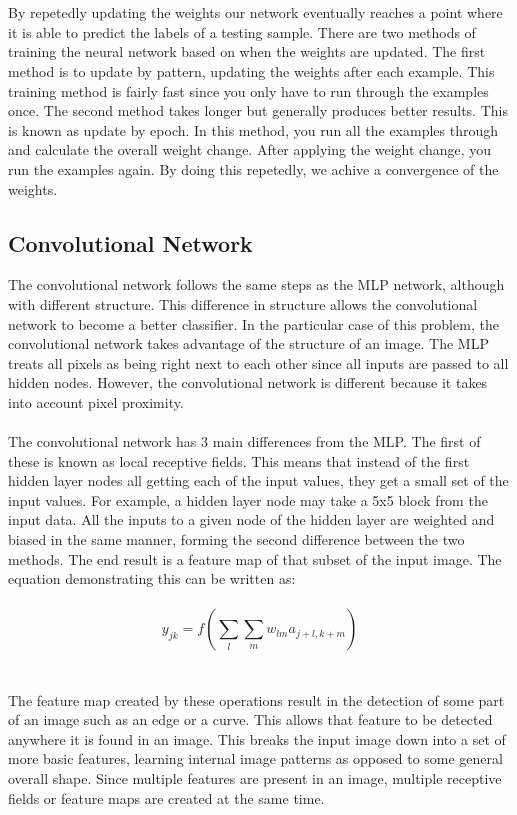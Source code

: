 \documentclass[paper=a4, fontsize=11pt]{scrartcl} %
\numberwithin{equation}{section} %
\numberwithin{figure}{section} %
\numberwithin{table}{section} %
\begin{document}
	\\\\
	By repetedly updating the weights our network eventually reaches a point where it is able to predict the labels of a testing sample. There are two methods of training the neural network based on when the weights are updated. The first method is to update by pattern, updating the weights after each example. This training method is fairly fast since you only have to run through the examples once. The second method takes longer but generally produces better results. This is known as update by epoch. In this method, you run all the examples through and calculate the overall weight change. After applying the weight change, you run the examples again. By doing this repetedly, we achive a convergence of the weights.
	\subsection{Convolutional Network}
	The convolutional network follows the same steps as the MLP network, although with different structure. This difference in structure allows the convolutional network to become a better classifier. In the particular case of this problem, the convolutional network takes advantage of the structure of an image. The MLP treats all pixels as being right next to each other since all inputs are passed to all hidden nodes. However, the convolutional network is different because it takes into account pixel proximity. 
	\\\\
	The convolutional network has 3 main differences from the MLP. The first of these is known as local receptive fields. This means that instead of the first hidden layer nodes all getting each of the input values, they get a small set of the input values. For example, a hidden layer node may take a 5x5 block from the input data. All the inputs to a given node of the hidden layer are weighted and biased in the same manner, forming the second difference between the two methods. The end result is a feature map of that subset of the input image. The equation demonstrating this can be written as:
	\\\\
	$$y_{jk} = f(\sum_{l}\sum_{m}w_{lm}a_{j+l, k+m})$$
	\\\\
	The feature map created by these operations result in the detection of some part of an image such as an edge or a curve. This allows that feature to be detected anywhere it is found in an image. This breaks the input image down into a set of more basic features, learning internal image patterns as opposed to some general overall shape. Since multiple features are present in an image, multiple receptive fields or feature maps are created at the same time.
\end{document}
